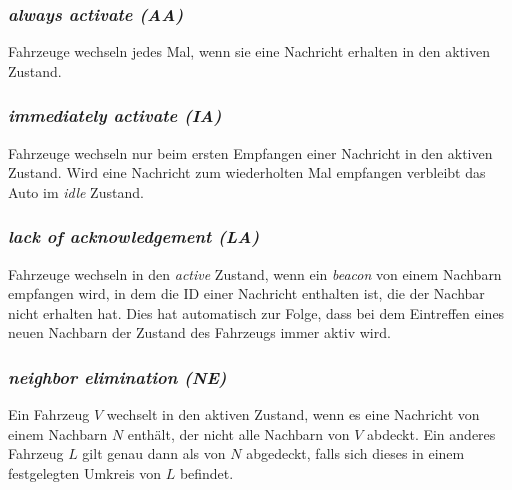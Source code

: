 \documentclass[english,runningheads,a4paper]{llncs}[2018/03/10]
\begin{document}
\subsubsection{\textit{always activate (AA)}}
Fahrzeuge wechseln jedes Mal, wenn sie eine Nachricht erhalten in den aktiven Zustand.
\subsubsection{\textit{immediately activate (IA)}}
Fahrzeuge wechseln nur beim ersten Empfangen einer Nachricht in den aktiven Zustand.
Wird eine Nachricht zum wiederholten Mal empfangen verbleibt das Auto im \textit{idle} Zustand.
\subsubsection{\textit{lack of acknowledgement (LA)}}
Fahrzeuge wechseln in den \textit{active} Zustand, wenn ein \textit{beacon} von einem Nachbarn empfangen wird, in dem die ID einer Nachricht enthalten ist, die der Nachbar nicht erhalten hat.
Dies hat automatisch zur Folge, dass bei dem Eintreffen eines neuen Nachbarn der Zustand des Fahrzeugs immer aktiv wird.
\subsubsection{\textit{neighbor elimination (NE)}}
Ein Fahrzeug $V$ wechselt in den aktiven Zustand, wenn es eine Nachricht von einem Nachbarn $N$ enthält, der nicht alle Nachbarn von $V$ abdeckt.
Ein anderes Fahrzeug $L$ gilt genau dann als von $N$ abgedeckt, falls sich dieses in einem festgelegten Umkreis von $L$ befindet.
\end{document}
